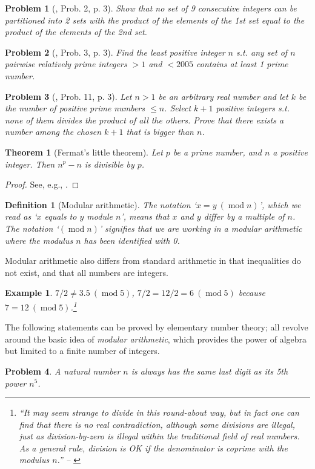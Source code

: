 \documentclass[oneside]{book}
\numberwithin{equation}{section}
\newtheorem{definition}{Definition}[section]
\newtheorem{theorem}{Theorem}[section]
\newtheorem{example}{Example}[section]
\newtheorem{problem}{Problem}[section]
\begin{document}
\begin{problem}[\cite{Gelca_Andreescu2017}, Prob. 2, p. 3]
	Show that no set of 9 consecutive integers can be partitioned into 2 sets with the product of the elements of the 1st set equal to the product of the elements of the 2nd set.
\end{problem}

\begin{problem}[\cite{Gelca_Andreescu2017}, Prob. 3, p. 3]
	Find the least positive integer $n$ s.t. any set of $n$ pairwise relatively prime integers $> 1$ and $< 2005$ contains at least 1 prime number.
\end{problem}

\begin{problem}[\cite{Gelca_Andreescu2017}, Prob. 11, p. 3]
	Let $n > 1$ be an arbitrary real number and let $k$ be the number of positive prime numbers $\le n$. Select $k + 1$ positive integers s.t. none of them divides the product of all the others. Prove that there exists a number among the chosen $k + 1$ that is bigger than $n$.
\end{problem}

\begin{theorem}[Fermat's little theorem]
	Let $p$ be a prime number, and $n$ a positive integer. Then $n^p - n$ is divisible by $p$.
\end{theorem}

\begin{proof}[Proof]
	See, e.g., \cite[p. 4]{Gelca_Andreescu2017}.
\end{proof}

\begin{definition}[Modular arithmetic]
	The notation `$x = y\ (\operatorname{mod} n)$', which we read as `$x$ equals to $y$ module $n$', means that $x$ and $y$ differ by a multiple of $n$. The notation `$(\operatorname{mod} n)$' signifies that we are working in a \emph{modular arithmetic} where the \emph{modulus $n$} has been identified with 0.
\end{definition}
Modular arithmetic also differs from standard arithmetic in that inequalities do not exist, and that all numbers are integers.

\begin{example}
	$7/2\ne 3.5\ (\operatorname{mod} 5)$, $7/2 = 12/2 = 6\ (\operatorname{mod} 5)$ because $7 = 12\ (\operatorname{mod} 5)$.\footnote{``It may seem strange to divide in this round-about way, but in fact one can find that there is no real contradiction, although some divisions are illegal, just as division-by-zero is illegal within the traditional field of real numbers. As a general rule, division is OK if the denominator is coprime with the modulus $n$.'' -- \cite[p. 10]{Tao2006}}
\end{example}
The following statements can be proved by elementary number theory; all revolve around the basic idea of \textit{modular arithmetic}, which provides the power of algebra but limited to a finite number of integers.
\begin{problem}
	A natural number $n$ is always has the same last digit as its 5th power $n^5$.
\end{problem}
\end{document}
